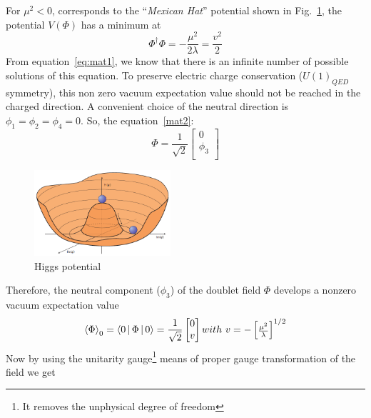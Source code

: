 For $\mu^2<0$, corresponds to the ``\textit{Mexican Hat}'' potential shown in Fig.~\ref{fig:higgsPotential}, the potential $V(\Phi)$ has a minimum at
\begin{equation}
    \Phi^{\dagger}\Phi = -\frac{\mu^2}{2\lambda}=\frac{v^2}{2}
\end{equation}
From equation~\ref{eq:mat1}, we know that there is an infinite number of possible solutions of this equation. To preserve electric charge conservation ($U(1)_{QED}$ symmetry), this non zero vacuum expectation value should not be reached in the charged direction. A convenient choice of the neutral direction is $\phi_1 = \phi_2 = \phi_4 = 0$. So, the equation~\ref{mat2}:
\begin{equation}
    \Phi=\frac{1}{\sqrt{2}}
        \begin{bmatrix}
        0   \\
        \phi_3  \\
        \end{bmatrix}
\end{equation}
\begin{figure}[!htbp]
    \centering
    \includegraphics[width=0.45\textwidth]{figures/Intro/higgspotential.png}
    \caption{Higgs potential~\cite{Ellis2015}}
    \label{fig:higgsPotential}
\end{figure}
Therefore, the neutral component ($\phi_3$) of the doublet field $\Phi$ develops a nonzero vacuum expectation value
\begin{equation}
    {\Braket\Phi}_0 = \Braket{0|\Phi|0}=\frac{1}{\sqrt{2}}
        \begin{bmatrix}
        0   \\
        v   \\
        \end{bmatrix}
        with~
        v=-
        \begin{bmatrix}
        \frac{\mu^2}{\lambda}
        \end{bmatrix}
        ^{1/2}
\end{equation}
Now by using the unitarity gauge\footnote{It removes the unphysical degree of freedom} means of proper gauge transformation of the field we get
